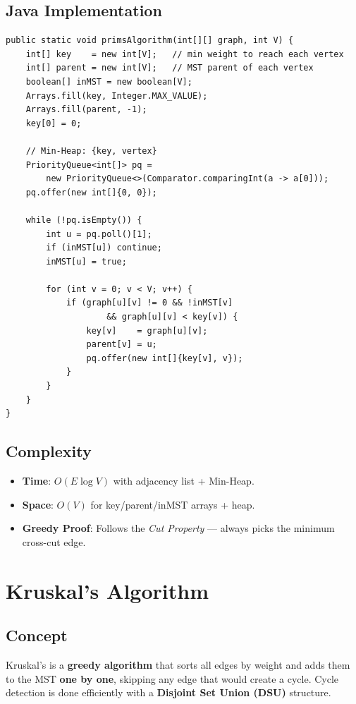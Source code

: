 \documentclass[12pt,a4paper]{article}
\begin{document}
\subsection{Java Implementation}
\begin{lstlisting}[style=javastyle, caption={Prim's Algorithm — Java}]
public static void primsAlgorithm(int[][] graph, int V) {
    int[] key    = new int[V];   // min weight to reach each vertex
    int[] parent = new int[V];   // MST parent of each vertex
    boolean[] inMST = new boolean[V];
    Arrays.fill(key, Integer.MAX_VALUE);
    Arrays.fill(parent, -1);
    key[0] = 0;

    // Min-Heap: {key, vertex}
    PriorityQueue<int[]> pq =
        new PriorityQueue<>(Comparator.comparingInt(a -> a[0]));
    pq.offer(new int[]{0, 0});

    while (!pq.isEmpty()) {
        int u = pq.poll()[1];
        if (inMST[u]) continue;
        inMST[u] = true;

        for (int v = 0; v < V; v++) {
            if (graph[u][v] != 0 && !inMST[v]
                    && graph[u][v] < key[v]) {
                key[v]    = graph[u][v];
                parent[v] = u;
                pq.offer(new int[]{key[v], v});
            }
        }
    }
}
\end{lstlisting}

\subsection{Complexity}
\begin{itemize}
    \item \textbf{Time}: $O(E \log V)$ with adjacency list + Min-Heap.
    \item \textbf{Space}: $O(V)$ for key/parent/inMST arrays + heap.
    \item \textbf{Greedy Proof}: Follows the \textit{Cut Property} — always picks the minimum cross-cut edge.
\end{itemize}

\newpage

\section{Kruskal's Algorithm}

\subsection{Concept}
Kruskal's is a \textbf{greedy algorithm} that sorts all edges by weight and adds them to the MST \textbf{one by one}, skipping any edge that would create a cycle. Cycle detection is done efficiently with a \textbf{Disjoint Set Union (DSU)} structure.
\end{document}
